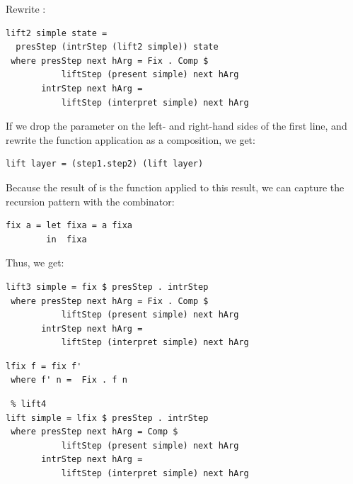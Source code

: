 \documentclass[preprint,natbib]{sigplanconf}
\begin{document}
Rewrite :

\begin{small} %
\begin{verbatim}
lift2 simple state =
  presStep (intrStep (lift2 simple)) state
 where presStep next hArg = Fix . Comp $
           liftStep (present simple) next hArg
       intrStep next hArg =
           liftStep (interpret simple) next hArg
\end{verbatim}%
\end{small}



If we drop the  parameter on the left- and right-hand sides of the first line, and rewrite the function application as a composition, we get:
\
\begin{small}
\begin{verbatim}
lift layer = (step1.step2) (lift layer)
\end{verbatim}
\end{small}

Because the result of  is the function  applied to this result, we can capture the recursion pattern with  the  combinator:

\begin{small}
\begin{verbatim}
fix a = let fixa = a fixa
        in  fixa
\end{verbatim}
\end{small}

Thus, we get:

\begin{small} %
\begin{verbatim}
lift3 simple = fix $ presStep . intrStep
 where presStep next hArg = Fix . Comp $
           liftStep (present simple) next hArg
       intrStep next hArg = 
           liftStep (interpret simple) next hArg
\end{verbatim}
\end{small}


\begin{small}
\begin{verbatim}
lfix f = fix f' 
 where f' n =  Fix . f n
\end{verbatim}
\end{small}

\begin{small}
\begin{verbatim} % lift4
lift simple = lfix $ presStep . intrStep
 where presStep next hArg = Comp $
           liftStep (present simple) next hArg
       intrStep next hArg = 
           liftStep (interpret simple) next hArg
\end{verbatim}
\end{small}
\end{document}
